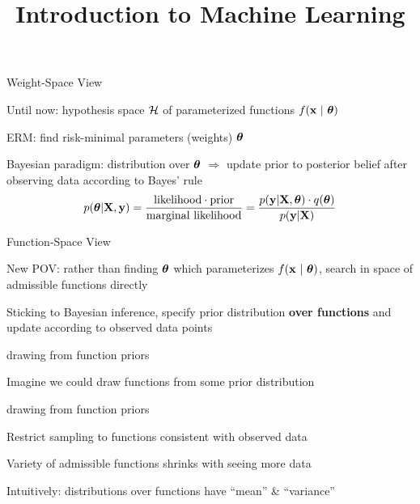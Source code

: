 \documentclass[11pt,compress,t,notes=noshow, xcolor=table]{beamer}
\title{Introduction to Machine Learning}
\begin{document}

\begin{framei}[sep=L]{Weight-Space View}
\item Until now: hypothesis space $\mathcal{H}$ of parameterized functions $f(\mathbf{x} ~|~ \bm{\theta})$ %
\item ERM: find risk-minimal parameters (weights) $\bm{\theta}$
\item Bayesian paradigm: distribution over $\bm{\theta}$ $\Rightarrow$ update prior to posterior belief after observing data according to Bayes' rule
$$
p(\bm{\theta} | \mathbf{X}, \mathbf{y}) 
= \frac{\text{likelihood} \cdot \text{prior}}{\text{marginal likelihood}} 
= \frac{p(\mathbf{y} | \mathbf{X}, \bm{\theta}) \cdot q(\bm{\theta})}{p(\mathbf{y}|\mathbf{X})}
$$
\end{framei}

\begin{framei}[sep=L]{Function-Space View}
\item \show\muv
\item New POV: rather than finding $\bm{\theta}$ which parameterizes $f(\mathbf{x} ~|~ \bm{\theta})$,  search in space of admissible functions directly
\item Sticking to Bayesian inference, specify prior distribution \textbf{over functions} and update according to observed data points
\end{framei}

\begin{framei}{drawing from function priors}
\item Imagine we could draw functions from some prior distribution

\vfill

\end{framei}

\begin{framei}{drawing from function priors}
\item Restrict sampling to functions consistent with observed data
\vfill
{}
\vfill
{}
\item Variety of admissible functions shrinks with seeing more data
\item Intuitively: distributions over functions have ``mean'' \& ``variance''
\end{framei}
\end{document}
